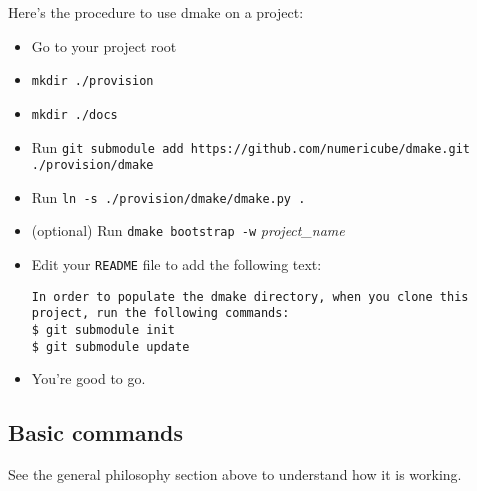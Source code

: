 Here's the procedure to use dmake on a project:

\begin{itemize}
    \item Go to your project root
    \item \texttt{mkdir ./provision}
    \item \texttt{mkdir ./docs}
    \item Run \texttt{git submodule add https://github.com/numericube/dmake.git ./provision/dmake}
    \item Run \texttt{ln -s ./provision/dmake/dmake.py .}
    \item (optional) Run \texttt{dmake bootstrap -w} \emph{project\_name}
    \item Edit your \texttt{README} file to add the following text:
        \begin{lstlisting}[style=Python-color]
In order to populate the dmake directory, when you clone this project, run the following commands:
$ git submodule init
$ git submodule update
        \end{lstlisting}
    \item You're good to go.
\end{itemize}


\subsection{Basic commands}

See the general philosophy section above to understand how it is working.


